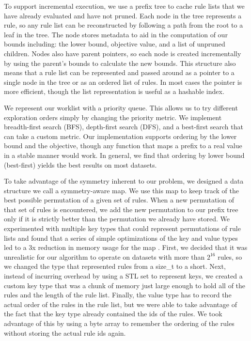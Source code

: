 \documentclass[format=sigconf]{acmart}
\begin{document}
To support incremental execution, we use a prefix tree to cache rule lists that we have already evaluated and have not pruned.
Each node in the tree represents a rule, so any rule list can be reconstructed by following a path from the root to a leaf in the tree.
The node stores metadata to aid in the computation of our bounds including: the lower bound, objective value, and a list of unpruned children.
Nodes also have parent pointers, so each node is created incrementally by using the parent's bounds to calculate the new bounds.
This structure also means that a rule list can be represented and passed around as a pointer to a single node in the tree or as an ordered list of rules.
In most cases the pointer is more efficient, though the list representation is useful as a hashable index.

We represent our worklist with a priority queue.
This allows us to try different exploration orders simply by changing the priority metric.
We implement breadth-first search (BFS), depth-first search (DFS), and a best-first search that can take a custom metric.
Our implementation supports ordering by the lower bound and the objective, though any function that maps a prefix to a real value in a stable manner would work.
In general, we find that ordering by lower bound (best-first) yields the best results on most datasets.

To take advantage of the symmetry inherent to our problem, we designed a data structure we call a symmetry-aware map.
We use this map to keep track of the best possible permutation of a given set of rules.
When a new permutation of that set of rules is encountered, we add the new permutation to our prefix tree only if it is strictly better than the permutation we already have stored.
We experimented with multiple key types that could represent permutations of rule lists and found that a series of simple optimizations of the key and value types led to a 3x reduction in memory usage for the map \cite{Larus-Stone17}.
First, we decided that it was unrealistic for our algorithm to operate on datasets with more than $2^{16}$ rules, so we changed the type that represented rules from a size\_t to a short.
Next, instead of incurring overhead by using a STL set to represent keys, we created a custom key type that was a chunk of memory just large enough to hold all of the rules and the length of the rule list.
Finally, the value type has to record the actual order of the rules in the rule list, but we were able to take advantage of the fact that the key type already contained the ids of the rules.
We took advantage of this by using a byte array to remember the ordering of the rules without storing the actual rule ids again.
\end{document}
